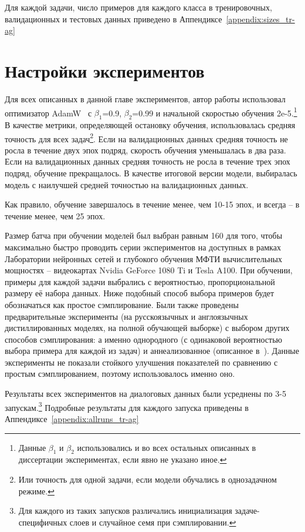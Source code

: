 Для каждой задачи, число примеров для каждого класса в тренировочных, валидационных и тестовых данных приведено в Аппендиксе~\ref{appendix:sizes_tr-ag} 

\section {Настройки экспериментов}\label{ch:tr-ag:settings}
Для всех описанных в данной главе экспериментов, автор работы использовал оптимизатор AdamW~\cite{kingma_2014} с  $\beta_1$=0.9, $\beta_2$=0.99 и начальной скоростью обучения 2e-5.\footnote{Данные $\beta_1$ и $\beta_2$ использовались и во всех остальных описанных в диссертации экспериментах, если явно не указано иное.}  В качестве метрики, определяющей остановку обучения, использовалась средняя точность для всех задач\footnote{Или точность для одной задачи, если модели обучались в однозадачном режиме.}. Если на валидационных данных средняя точность не росла в течение двух эпох подряд, скорость обучения уменьшалась в два раза. Если на валидационных данных средняя точность не росла в течение трех эпох подряд, обучение прекращалось. В качестве итоговой версии модели, выбиралась модель с наилучшей средней точностью на валидационных данных.

Как правило, обучение завершалось в течение менее, чем 10-15 эпох, и всегда -- в течение менее, чем 25 эпох. 

Размер батча при обучении моделей был выбран равным 160 для того, чтобы максимально быстро проводить серии экспериментов на доступных в рамках Лаборатории нейронных сетей и глубокого обучения МФТИ вычислительных мощностях -- видеокартах Nvidia GeForce 1080 Ti и Tesla A100.
При обучении, примеры для каждой задачи выбрались с вероятностью, пропорциональной размеру её набора данных. Ниже подобный способ выбора примеров будет обозначаться как простое сэмплирование. Были также проведены предварительные эксперименты (на русскоязычных и англоязычных дистиллированных моделях, на полной обучающей выборке) с выбором других способов сэмплирования: а именно однородного (с одинаковой вероятностью выбора примера для каждой из задач) и аннеализованное (описанное в~\cite{stickland_2019}). Данные эксперименты не показали стойкого улучшения показателей по сравнению с простым сэмплированием, поэтому использовалось именно оно. 

Результаты всех экспериментов на диалоговых данных были усреднены по 3-5 запускам.\footnote{Для каждого из таких запусков различались инициализация задаче-специфичных слоев и случайное семя при сэмплировании.} Подробные результаты для каждого запуска приведены в Аппендиксе~\ref{appendix:allruns_tr-ag}

